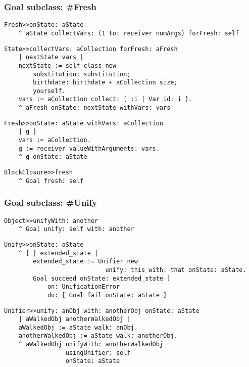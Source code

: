 \documentclass{beamer}
\begin{document}
\begin{frame}[fragile]
\frametitle{Goal subclass: \#Fresh}
\begin{verbatim}
Fresh>>onState: aState
    ^ aState collectVars: (1 to: receiver numArgs) forFresh: self
\end{verbatim}
\begin{verbatim}
State>>collectVars: aCollection forFresh: aFresh
    | nextState vars |
    nextState := self class new
        substitution: substitution;
        birthdate: birthdate + aCollection size;
        yourself.
    vars := aCollection collect: [ :i | Var id: i ].
    ^ aFresh onState: nextState withVars: vars
\end{verbatim}
\begin{verbatim}
Fresh>>onState: aState withVars: aCollection
    | g |
    vars := aCollection.
    g := receiver valueWithArguments: vars.
    ^ g onState: aState
\end{verbatim}
\begin{verbatim}
BlockClosure>>fresh
    ^ Goal fresh: self
\end{verbatim}
\end{frame}


\begin{frame}[fragile]
\frametitle{Goal subclass: \#Unify}
\begin{verbatim}
Object>>unifyWith: another
    ^ Goal unify: self with: another
\end{verbatim}
\begin{verbatim}
Unify>>onState: aState
    ^ [ | extended_state |
        extended_state := Unifier new
                            unify: this with: that onState: aState.
        Goal succeed onState: extended_state ]
            on: UnificationError
            do: [ Goal fail onState: aState ]
\end{verbatim}
\begin{verbatim}
Unifier>>unify: anObj with: anotherObj onState: aState
    | aWalkedObj anotherWalkedObj |
    aWalkedObj := aState walk: anObj.
    anotherWalkedObj := aState walk: anotherObj.
    ^ aWalkedObj unifyWith: anotherWalkedObj
                 usingUnifier: self
                 onState: aState
\end{verbatim}
\end{frame}
\end{document}
